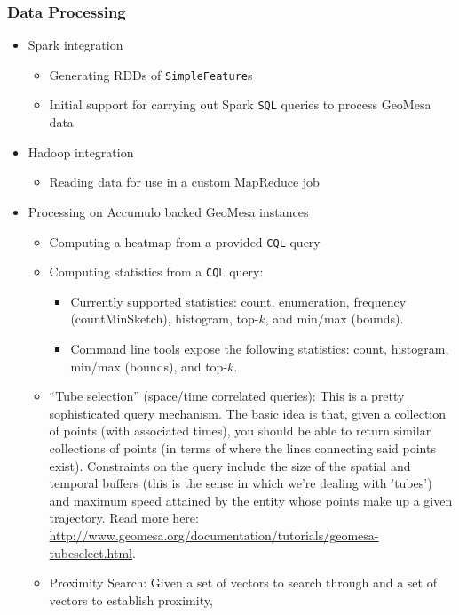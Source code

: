 \subsubsection*{Data Processing}

\begin{itemize}
\item{Spark integration
  \begin{itemize}
  \item Generating RDDs of \texttt{SimpleFeature}s
  \item Initial support for carrying out Spark \texttt{SQL} queries to process GeoMesa data
  \end{itemize}
}
\item{Hadoop integration
  \begin{itemize}
    \item Reading data for use in a custom MapReduce job
  \end{itemize}
}
\item{Processing on Accumulo backed GeoMesa instances
  \begin{itemize}
  \item Computing a heatmap from a provided \texttt{CQL} query
  \item {
    Computing statistics from a \texttt{CQL} query:
    \begin{itemize}
    \item Currently supported statistics: count, enumeration, frequency (countMinSketch), histogram, top-$k$, and min/max (bounds).
    \item Command line tools expose the following statistics: count, histogram, min/max (bounds), and top-$k$.
    \end{itemize}
    }
  \item{
    ``Tube selection'' (space/time correlated queries): This is a pretty sophisticated query mechanism.
    The basic idea is that, given a collection of points (with associated times),
    you should be able to return similar collections of points (in terms of where the lines connecting said points exist).
    Constraints on the query include the size of the spatial and temporal buffers (this is the sense in which we're dealing with 'tubes') and maximum speed attained by the entity whose points make up a given trajectory.
    Read more here: \url{http://www.geomesa.org/documentation/tutorials/geomesa-tubeselect.html}.
  }
  \item{
    Proximity Search: Given a set of vectors to search through and a set of vectors to establish proximity,
}
\end{itemize}}
\end{itemize}
